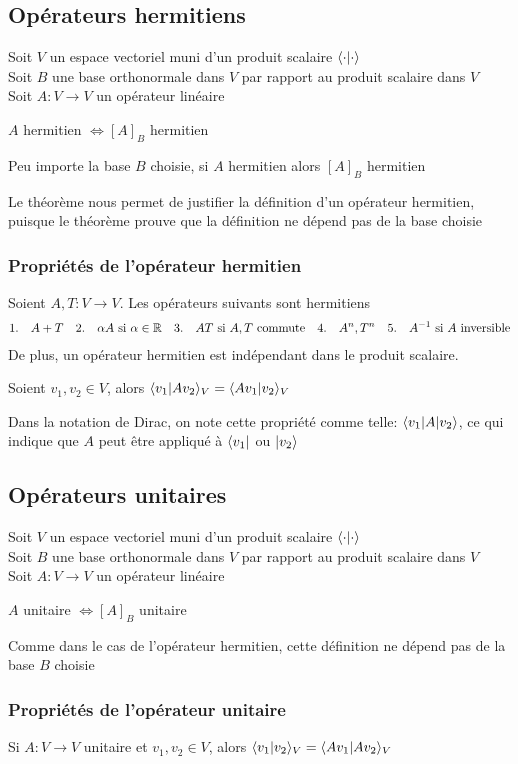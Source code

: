 \subsection{Opérateurs hermitiens}
Soit $V$ un espace vectoriel muni d'un produit scalaire $\langle \cdot \lvert \cdot \rangle$ \\
Soit $B$ une base orthonormale dans $V$ par rapport au produit scalaire dans $V$ \\
Soit $A\colon V \to V$ un opérateur linéaire
\begin{definition}
    $A$ hermitien $\iff [A]_B$ hermitien 
\end{definition}
\begin{theorem}
    Peu importe la base $B$ choisie, si $A$ hermitien alors $[A]_B$ hermitien
\end{theorem}
\begin{remark}
    Le théorème nous permet de justifier la définition d'un opérateur hermitien, puisque 
    le théorème prouve que la définition ne dépend pas de la base choisie
\end{remark}

\subsubsection{Propriétés de l'opérateur hermitien}
Soient $A, T\colon V \to V$. Les opérateurs suivants sont hermitiens
\begin{align*}
    1. \quad A + T& &2. \quad \alpha A \ \text{si} \ \alpha \in \R& &3. \quad AT \ \text{si} \ A,T \ \text{commute}& &4. \quad A^n, T^n& &5. \quad A^{-1} \ \text{si} \ A \ \text{inversible} 
\end{align*}
De plus, un opérateur hermitien est indépendant dans le produit scalaire. 
\begin{lemma}
    Soient $v_1, v_2 \in V$, alors $\langle v_1 \lvert Av_2 \rangle_V = \langle Av_1 \lvert v_2 \rangle_V$
\end{lemma}
\noindent
Dans la notation de Dirac, on note cette propriété comme telle: $\langle v_1\rvert A\lvert v_2\rangle$,
ce qui indique que $A$ peut être appliqué à $\langle v_1\rvert$ ou $\lvert v_2\rangle$

\subsection{Opérateurs unitaires}
Soit $V$ un espace vectoriel muni d'un produit scalaire $\langle \cdot \lvert \cdot \rangle$ \\
Soit $B$ une base orthonormale dans $V$ par rapport au produit scalaire dans $V$ \\
Soit $A\colon V \to V$ un opérateur linéaire
\begin{definition}
    $A$ unitaire $\iff [A]_B$ unitaire 
\end{definition}
\begin{remark}
    Comme dans le cas de l'opérateur hermitien, cette définition ne dépend pas de la base $B$ choisie
\end{remark}

\subsubsection{Propriétés de l'opérateur unitaire}
\begin{lemma}
    Si $A\colon V \to V$ unitaire et $v_1, v_2 \in V$, alors $\langle v_1 \lvert v_2 \rangle_V = \langle Av_1 \lvert Av_2 \rangle_V $
\end{lemma}